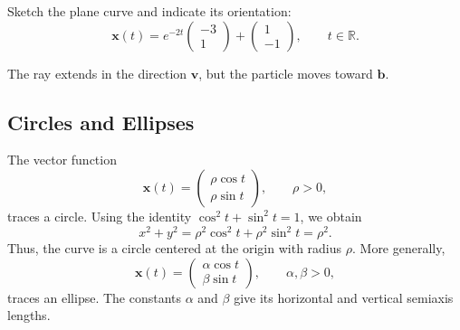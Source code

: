 \documentclass[11pt,letterpaper]{article}
\begin{document}
\begin{example}[5]{
Sketch the plane curve and indicate its orientation:
\[
\mathbf{x}(t)=e^{-2t}
\begin{pmatrix}-3\\1\end{pmatrix}
+\begin{pmatrix}1\\-1\end{pmatrix},
\qquad t\in\mathbb R.
\]
}
\begin{center}

\small
The ray extends in the direction $\mathbf{v}$,
but the particle moves toward $\mathbf{b}$.
\end{center}
\end{example}

\subsection{Circles and Ellipses}

The vector function
\[
\mathbf{x}(t)=
\begin{pmatrix}
\rho\cos t\\
\rho\sin t
\end{pmatrix},
\qquad \rho>0,
\]
traces a circle. Using the identity
$\cos^2t+\sin^2t=1$, we obtain
\[
x^2+y^2
=\rho^2\cos^2t+\rho^2\sin^2t
=\rho^2.
\]
Thus, the curve is a circle centered at the origin
with radius $\rho$. More generally,
\[
\mathbf{x}(t)=
\begin{pmatrix}
\alpha\cos t\\
\beta\sin t
\end{pmatrix},
\qquad \alpha,\beta>0,
\]
traces an ellipse. The constants $\alpha$ and $\beta$
give its horizontal and vertical semiaxis lengths.
\end{document}
